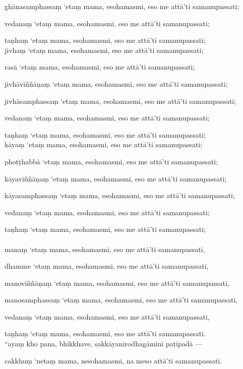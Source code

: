 \documentclass[10pt]{article}
\begin{document}
ghānasamphassaṃ ‘etaṃ mama, esohamasmi, eso me attā’ti samanupassati;\

vedanaṃ ‘etaṃ mama, esohamasmi, eso me attā’ti samanupassati;\

taṇhaṃ ‘etaṃ mama, esohamasmi, eso me attā’ti samanupassati;\\

jivhaṃ ‘etaṃ mama, esohamasmi, eso me attā’ti samanupassati;\

rasā ‘etaṃ mama, esohamasmi, eso me attā’ti samanupassati;\

jivhāviññāṇaṃ ‘etaṃ mama, esohamasmi, eso me attā’ti samanupassati;\

jivhāsamphassaṃ ‘etaṃ mama, esohamasmi, eso me attā’ti samanupassati;\

vedanaṃ ‘etaṃ mama, esohamasmi, eso me attā’ti samanupassati;\

taṇhaṃ ‘etaṃ mama, esohamasmi, eso me attā’ti samanupassati;\\

kāyaṃ ‘etaṃ mama, esohamasmi, eso me attā’ti samanupassati;\

phoṭṭhabbā ‘etaṃ mama, esohamasmi, eso me attā’ti samanupassati;\

kāyaviññāṇaṃ ‘etaṃ mama, esohamasmi, eso me attā’ti samanupassati;\

kāyasamphassaṃ ‘etaṃ mama, esohamasmi, eso me attā’ti samanupassati;\

vedanaṃ ‘etaṃ mama, esohamasmi, eso me attā’ti samanupassati;\

taṇhaṃ ‘etaṃ mama, esohamasmi, eso me attā’ti samanupassati;\\
\pagebreak\\

manaṃ ‘etaṃ mama, esohamasmi, eso me attā’ti samanupassati,\

dhamme ‘etaṃ mama, esohamasmi, eso me attā’ti samanupassati,\

manoviññāṇaṃ ‘etaṃ mama, esohamasmi, eso me attā’ti samanupassati,\

manosamphassaṃ ‘etaṃ mama, esohamasmi, eso me attā’ti samanupassati,\

vedanaṃ ‘etaṃ mama, esohamasmi, eso me attā’ti samanupassati,\

taṇhaṃ ‘etaṃ mama, esohamasmi, eso me attā’ti samanupassati.\\

“ayaṃ kho pana, bhikkhave, sakkāyanirodhagāminī paṭipadā — 

cakkhuṃ ‘netaṃ mama, nesohamasmi, na meso attā’ti samanupassati.\
\end{document}

